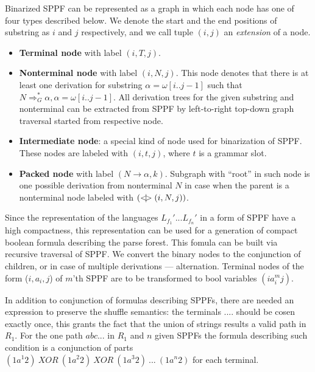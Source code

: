 

Binarized SPPF can be represented as a graph in which each node has one of four types described below.
We denote the start and the end positions of substring as $i$ and $j$ respectively, and we call tuple $(i,j)$ an \textit{extension} of a node.

\begin{itemize}
	\item \textbf{Terminal node} with label $(i, T, j)$.
	\item \textbf{Nonterminal node} with label $(i, N, j)$. 
	This node denotes that there is at least one derivation for substring $\alpha=\omega[i..j-1]$ such that $N \Rightarrow^*_G \alpha, \alpha = \omega[i..j-1] $.
	All derivation trees for the given substring and nonterminal can be extracted from SPPF by left-to-right top-down graph traversal started from respective node.     
	\item \textbf{Intermediate node}: a special kind of node used for binarization of SPPF. These nodes are labeled with $(i,t,j)$, where $t$ is a grammar slot.
	\item \textbf{Packed node} with label $(N \rightarrow \alpha, k)$. 
	Subgraph with ``root'' in such node is one possible derivation from nonterminal $N$ in case when the parent is a nonterminal node labeled with $(<\mkern-9mu | \mkern-9mu> (i, N, j))$.
	
\end{itemize}

Since the representation of the languages $ L_{f_1}' ... L_{f_n}'$ in a form of SPPF have a high compactness, 
this representation can be used for a generation of compact boolean formula describing the parse forest. This fomula 
can be built via recursive traversal of SPPF. We convert the binary nodes to the conjunction of children, or in case of multiple 
derivations --- alternation. Terminal nodes of the form ($i,a_i,j$) of $m$'th SPPF are to be transformed to bool
variables $(ia_i^mj)$.

In addition to conjunction of formulas describing SPPFs, there are needed an expression to preserve the
shuffle semantics: the terminals .... should be cosen exactly once, this grants the fact that the union of strings results a valid 
path in $R_1$. For the one path $a b c ...$ in $R_1$ and $n$ given SPPFs the formula describing such condition is a 
conjunction of parts $(1a^1 2)\ XOR\ (1a^2 2)\ XOR\ (1a^3 2)\ ...\ (1a^n 2) $ for each terminal.

